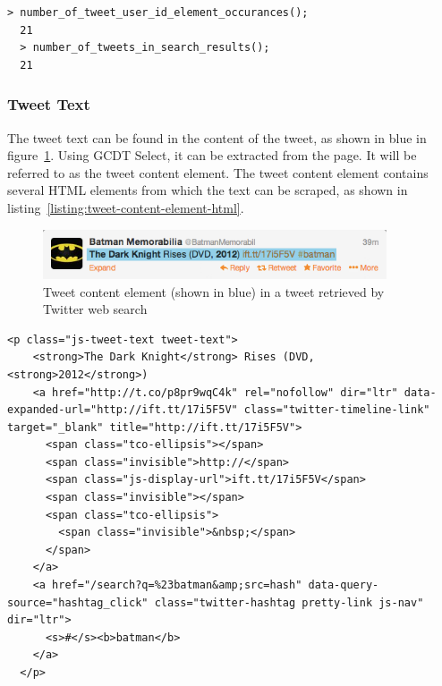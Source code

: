 \begin{lstlisting}[caption={Running functions in GCDT JS Console to show that the number of user id elements matches the number of tweets},label={user-id-elements-matches-tweets},captionpos=b]
  > number_of_tweet_user_id_element_occurances();
  21
  > number_of_tweets_in_search_results();
  21
\end{lstlisting}

\subsubsection{Tweet Text}
The tweet text can be found in the content of the tweet, as shown in blue in figure~\ref{figure:tweet-text-field}. Using GCDT Select, it can be extracted from the page. It will be referred to as the tweet content element. The tweet content element contains several HTML elements from which the text can be scraped, as shown in listing~\ref{listing:tweet-content-element-html}.

\begin{figure}[H]
\includegraphics[width=4in]{image/tweet-text-and-url-field.png}
\centering
\caption[Tweet content element in tweet]{Tweet content element (shown in blue) in a tweet retrieved by Twitter web search}
\label{figure:tweet-text-field}
\end{figure}

\begin{lstlisting}[caption={HTML of the tweet content element in a tweet},label={listing:tweet-content-element-html},captionpos=b]
  <p class="js-tweet-text tweet-text">
    <strong>The Dark Knight</strong> Rises (DVD, <strong>2012</strong>)
    <a href="http://t.co/p8pr9wqC4k" rel="nofollow" dir="ltr" data-expanded-url="http://ift.tt/17i5F5V" class="twitter-timeline-link" target="_blank" title="http://ift.tt/17i5F5V">
      <span class="tco-ellipsis"></span>
      <span class="invisible">http://</span>
      <span class="js-display-url">ift.tt/17i5F5V</span>
      <span class="invisible"></span>
      <span class="tco-ellipsis">
        <span class="invisible">&nbsp;</span>
      </span>
    </a>
    <a href="/search?q=%23batman&amp;src=hash" data-query-source="hashtag_click" class="twitter-hashtag pretty-link js-nav" dir="ltr">
      <s>#</s><b>batman</b>
    </a>
  </p>
\end{lstlisting}

